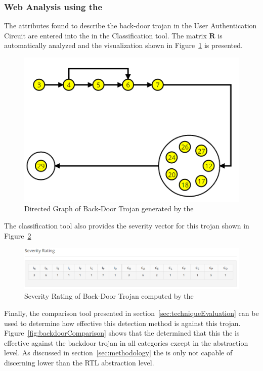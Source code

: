 \subsubsection{Web Analysis using the \WebName}
The attributes found to describe the back-door trojan in the User Authentication Circuit are entered into the \WebNameNoPeriod in the Classification tool.
The matrix $\mathbf{R}$ is automatically analyzed and the visualization shown in Figure~\ref{fig:backDoorVisual} is presented.
\begin{figure}[h]
\centering
\includegraphics[width=0.7\linewidth]{Figures/backDoorVisual}
\caption[Directed Graph of Back-Door Trojan generated by the \WebName]{Directed Graph of Back-Door Trojan generated by the \WebName}
\label{fig:backDoorVisual}
\end{figure}
The classification tool also provides the severity vector for this trojan shown in Figure~\ref{fig:backDoorSeverity}
\begin{figure}[h]
\centering
\includegraphics[width=1\linewidth]{Figures/backDoorSeverity}
\caption[Severity Rating of Back-Door Trojan computed by the \WebName]{Severity Rating of Back-Door Trojan computed by the \WebName}
\label{fig:backDoorSeverity}
\end{figure}
Finally, the comparison tool presented in section~\ref{sec:techniqueEvaluation} can be used to determine how effective this detection method is against this trojan.
Figure~\ref{fig:backdoorComparison} shows that the \WebNameNoPeriod determined that this the \NameNoPeriod is effective against the backdoor trojan in all categories except in the abstraction level. 
As discussed in section~\ref{sec:methodology} the \NameNoPeriod is only not capable of discerning lower than the \acrfull{RTL} abstraction level. 
